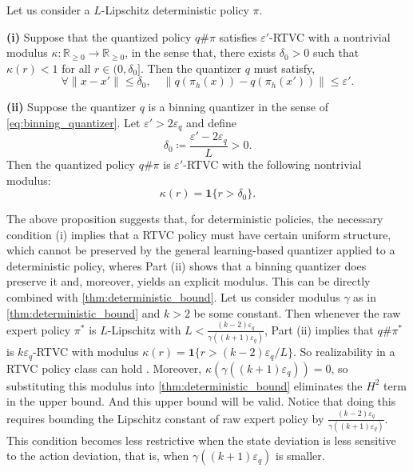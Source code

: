 \documentclass{article}
\begin{document}
\begin{proposition}\label{prop:RTVC_necessary_and_sufficient_condition}
Let us consider a $L$-Lipschitz deterministic policy $\pi$.

\textbf{(i)}
Suppose that the quantized policy $q\#\pi$ satisfies $\varepsilon'$-RTVC with
a nontrivial modulus $\kappa:\mathbb R_{\ge 0}\to\mathbb R_{\ge 0}$, in the sense that, there exists $\delta_0>0$ such that $\kappa(r)<1$ for all $r\in(0,\delta_0]$.
Then the quantizer $q$ must satisfy,
\begin{equation*}
    \forall \|x - x'\| \leq \delta_0,\quad \|q(\pi_h(x)) - q(\pi_h(x'))\| \leq \varepsilon'.
\end{equation*}

\textbf{(ii)}
Suppose the quantizer $q$ is a binning quantizer in the sense of \cref{eq:binning_quantizer}. 
Let $\varepsilon'>2\varepsilon_q$ and define
\begin{equation*}
    \delta_0\coloneqq \frac{\varepsilon'-2\varepsilon_q}{L}>0.
\end{equation*}
Then the quantized policy $q\#\pi$ is $\varepsilon'$-RTVC with the following nontrivial modulus: 
\begin{equation*}
    \kappa(r)=\mathbf 1\{r>\delta_0\}.
\end{equation*}
\end{proposition}
The above proposition suggests that, for deterministic policies, the necessary condition (i) implies that a RTVC policy must have certain uniform structure, which cannot be preserved by the general learning-based quantizer applied to a deterministic policy, wheres Part (ii) shows that a binning quantizer does preserve it and, moreover, yields an explicit modulus. This can be directly combined with \cref{thm:deterministic_bound}. Let us consider modulus $\gamma$ as in  \cref{thm:deterministic_bound} and $k>2$ be some constant. Then whenever the raw expert policy $\pi^*$ is $L$-Lipschitz with $L<\frac{(k-2)\varepsilon_q}{\gamma((k+1)\varepsilon_q)}$, Part (ii) implies that $q\#\pi^*$ is $k\varepsilon_q$-RTVC with modulus $\kappa(r)=\mathbf{1}\{r>(k-2)\varepsilon_q/L\}$. So realizability in a RTVC policy class can hold . Moreover, $\kappa(\gamma((k+1)\varepsilon_q))=0$, so substituting this modulus into \cref{thm:deterministic_bound} eliminates the $H^2$ term in the upper bound.  And this upper bound will be valid. Notice that doing this requires bounding the Lipschitz constant of raw expert policy by $\frac{(k-2)\varepsilon_q}{\gamma((k+1)\varepsilon_q)}$. This condition becomes less restrictive when the state deviation is less sensitive to the action deviation, that is, when $\gamma((k+1)\varepsilon_q)$ is smaller. 
\end{document}
